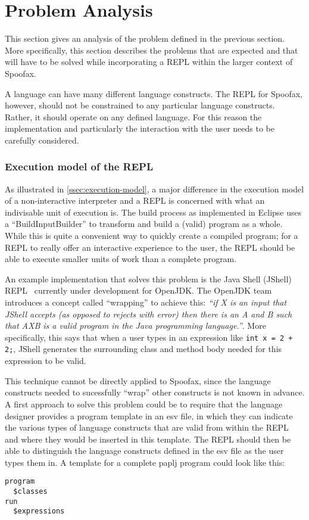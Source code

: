 \section{Problem Analysis}
\label{sec:problem-analysis}
This section gives an analysis of the problem defined in the previous section.
More specifically, this section describes the problems that are expected and
that will have to be solved while incorporating a REPL
within the larger context of Spoofax.

A language can have many different language constructs. The REPL for Spoofax,
however, should not be constrained to any particular language constructs.
Rather, it should operate on any defined language. For this reason the
implementation and particularly the interaction with the user needs to be
carefully considered.

\subsubsection{Execution model of the REPL}
\label{ssec:execution-model-repl}
As illustrated in \cref{ssec:execution-model}, a major difference in the
execution model of a non-interactive interpreter and a REPL is concerned with
what an indivisable unit of execution is. The build process as implemented in
Eclipse uses a ``BuildInputBuilder'' to transform and build a (valid) program
as a whole. While this is quite a convenient way to quickly create a compiled
program; for a REPL to really offer an interactive experience to the user, the
REPL should be able to execute smaller units of work than a complete program.

An example implementation that solves this problem is the Java Shell (JShell)
REPL~\cite{jshell-repl} currently under development for OpenJDK. The OpenJDK
team introduces a concept called ``wrapping'' to achieve this: \textit{``if X
is an input that JShell accepts (as opposed to rejects with error) then there
is an A and B such that AXB is a valid program in the Java programming
language.''}. More specifically, this says that when a user types in an
expression like \texttt{int x = 2 + 2;}, JShell generates the surrounding class and
method body needed for this expression to be valid.

This technique cannot be directly applied to Spoofax, since the language
constructs needed to sucessfully ``wrap'' other constructs is not known in
advance. A first approach to solve this problem could be to require that the
language designer provides a program template in an esv file, in which they can
indicate the various types of language constructs that are valid from within
the REPL and where they would be inserted in this template. The REPL should
then be able to distinguish the language constructs defined in the esv file as
the user types them in. A template for a complete paplj program could look
like this:
\begin{lstlisting}
program
  $classes
run
  $expressions
\end{lstlisting}

